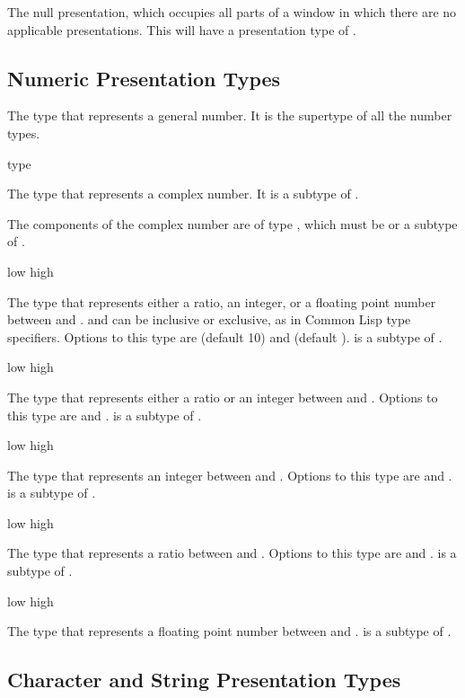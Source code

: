 The null presentation, which occupies all parts of a window in which there are
no applicable presentations.  This will have a presentation type of .


\subsection {Numeric Presentation Types}

 {}

The type that represents a general number.  It is the supertype of all the
number types.

 {\optional type}

The type that represents a complex number.  It is a subtype of .

The components of the complex number are of type , which must be
 or a subtype of .

 {\optional low high}

The type that represents either a ratio, an integer, or a floating point number
between  and .   and  can be inclusive or
exclusive, as in Common Lisp type specifiers.  Options to this type are
 (default 10) and  (default ).   is a
subtype of .

 {\optional low high}

The type that represents either a ratio or an integer between  and
.  Options to this type are  and .  
is a subtype of .

 {\optional low high}

The type that represents an integer between  and .  Options
to this type are  and .   is a subtype of
.

 {\optional low high}

The type that represents a ratio between  and .  Options to
this type are  and .   is a subtype of
.

 {\optional low high}

The type that represents a floating point number between  and
.   is a subtype of .


\subsection {Character and String Presentation Types}

